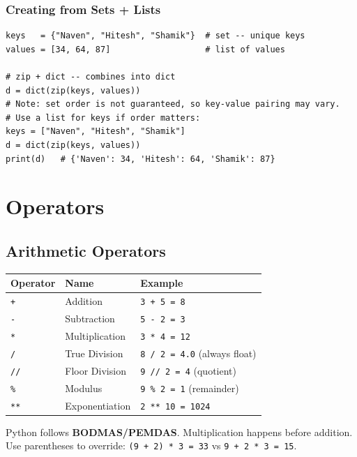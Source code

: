 \documentclass[12pt,a4paper]{article}
\newcommand{\code}[1]{\texttt{\small\color{pyblue}#1}}
\begin{document}
\subsubsection{Creating from Sets + Lists}

\begin{lstlisting}
keys   = {"Naven", "Hitesh", "Shamik"}  # set -- unique keys
values = [34, 64, 87]                   # list of values

# zip + dict -- combines into dict
d = dict(zip(keys, values))
# Note: set order is not guaranteed, so key-value pairing may vary.
# Use a list for keys if order matters:
keys = ["Naven", "Hitesh", "Shamik"]
d = dict(zip(keys, values))
print(d)   # {'Naven': 34, 'Hitesh': 64, 'Shamik': 87}
\end{lstlisting}

\section{Operators}

\subsection{Arithmetic Operators}

\begin{center}
\begin{tabular}{lll}
\toprule
\textbf{Operator} & \textbf{Name} & \textbf{Example} \\
\midrule
\texttt{+} & Addition & \texttt{3 + 5 = 8} \\
\texttt{-} & Subtraction & \texttt{5 - 2 = 3} \\
\texttt{*} & Multiplication & \texttt{3 * 4 = 12} \\
\texttt{/} & True Division & \texttt{8 / 2 = 4.0} (always float) \\
\texttt{//} & Floor Division & \texttt{9 // 2 = 4} (quotient) \\
\texttt{\%} & Modulus & \texttt{9 \% 2 = 1} (remainder) \\
\texttt{**} & Exponentiation & \texttt{2 ** 10 = 1024} \\
\bottomrule
\end{tabular}
\end{center}

\begin{notebox}
Python follows \textbf{BODMAS/PEMDAS}. Multiplication happens before addition. Use parentheses to override: \code{(9 + 2) * 3 = 33} vs \code{9 + 2 * 3 = 15}.
\end{notebox}
\end{document}
